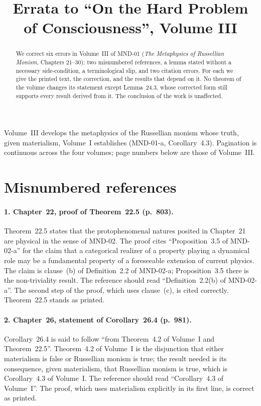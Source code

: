 \documentclass{situationist-preprint}
\title{Errata to \enquote{On the Hard Problem of Consciousness}, Volume III}
\begin{document}
\maketitle

\begin{abstract}
We correct six errors in Volume~III of MND-01 (\emph{The Metaphysics of Russellian Monism}, Chapters 21--30): two misnumbered references, a lemma stated without a necessary side-condition, a terminological slip, and two citation errors. For each we give the printed text, the correction, and the results that depend on it. No theorem of the volume changes its statement except Lemma~24.3, whose corrected form still supports every result derived from it. The conclusion of the work is unaffected.
\end{abstract}

Volume~III develops the metaphysics of the Russellian monism whose truth, given materialism, Volume~I establishes (MND-01-a, Corollary~4.3). Pagination is continuous across the four volumes; page numbers below are those of Volume~III.

\section{Misnumbered references}

\paragraph{1. Chapter~22, proof of Theorem~22.5 (p.~803).} Theorem~22.5 states that the protophenomenal natures posited in Chapter~21 are physical in the sense of MND-02. The proof cites \enquote{Proposition~3.5 of MND-02-a} for the claim that a categorical realizer of a property playing a dynamical role may be a fundamental property of a foreseeable extension of current physics. The claim is clause~(b) of Definition~2.2 of MND-02-a; Proposition~3.5 there is the non-triviality result. The reference should read \enquote{Definition~2.2(b) of MND-02-a}. The second step of the proof, which uses clause~(c), is cited correctly. Theorem~22.5 stands as printed.

\paragraph{2. Chapter~26, statement of Corollary~26.4 (p.~981).} Corollary~26.4 is said to follow \enquote{from Theorem~4.2 of Volume~I and Theorem~22.5}. Theorem~4.2 of Volume~I is the disjunction that either materialism is false or Russellian monism is true; the result needed is its consequence, given materialism, that Russellian monism is true, which is Corollary~4.3 of Volume~I. The reference should read \enquote{Corollary~4.3 of Volume~I}. The proof, which uses materialism explicitly in its first line, is correct as printed.
\end{document}

